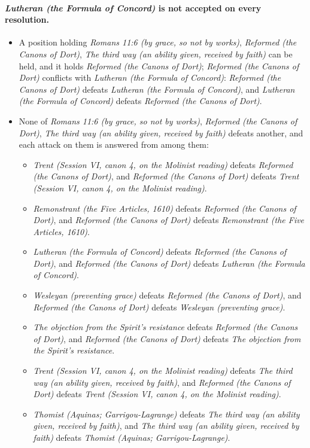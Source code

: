 \documentclass[11pt]{article}
\begin{document}
\paragraph{\emph{Lutheran (the Formula of Concord)} is not accepted on every resolution.}
\begin{itemize}
\item A position holding \emph{Romans 11:6 (by grace, so not by works)}, \emph{Reformed (the Canons of Dort)}, \emph{The third way (an ability given, received by faith)} can be held, and it holds \emph{Reformed (the Canons of Dort)}; \emph{Reformed (the Canons of Dort)} conflicts with \emph{Lutheran (the Formula of Concord)}: \emph{Reformed (the Canons of Dort)} defeats \emph{Lutheran (the Formula of Concord)}, and \emph{Lutheran (the Formula of Concord)} defeats \emph{Reformed (the Canons of Dort)}.
\item None of \emph{Romans 11:6 (by grace, so not by works)}, \emph{Reformed (the Canons of Dort)}, \emph{The third way (an ability given, received by faith)} defeats another, and each attack on them is answered from among them:
\begin{itemize}
\item \emph{Trent (Session VI, canon 4, on the Molinist reading)} defeats \emph{Reformed (the Canons of Dort)}, and \emph{Reformed (the Canons of Dort)} defeats \emph{Trent (Session VI, canon 4, on the Molinist reading)}.
\item \emph{Remonstrant (the Five Articles, 1610)} defeats \emph{Reformed (the Canons of Dort)}, and \emph{Reformed (the Canons of Dort)} defeats \emph{Remonstrant (the Five Articles, 1610)}.
\item \emph{Lutheran (the Formula of Concord)} defeats \emph{Reformed (the Canons of Dort)}, and \emph{Reformed (the Canons of Dort)} defeats \emph{Lutheran (the Formula of Concord)}.
\item \emph{Wesleyan (preventing grace)} defeats \emph{Reformed (the Canons of Dort)}, and \emph{Reformed (the Canons of Dort)} defeats \emph{Wesleyan (preventing grace)}.
\item \emph{The objection from the Spirit’s resistance} defeats \emph{Reformed (the Canons of Dort)}, and \emph{Reformed (the Canons of Dort)} defeats \emph{The objection from the Spirit’s resistance}.
\item \emph{Trent (Session VI, canon 4, on the Molinist reading)} defeats \emph{The third way (an ability given, received by faith)}, and \emph{Reformed (the Canons of Dort)} defeats \emph{Trent (Session VI, canon 4, on the Molinist reading)}.
\item \emph{Thomist (Aquinas; Garrigou-Lagrange)} defeats \emph{The third way (an ability given, received by faith)}, and \emph{The third way (an ability given, received by faith)} defeats \emph{Thomist (Aquinas; Garrigou-Lagrange)}.
\end{itemize}
\end{itemize}
\end{document}
